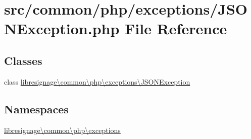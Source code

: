 \hypertarget{JSONException_8php}{}\section{src/common/php/exceptions/\+J\+S\+O\+N\+Exception.php File Reference}
\label{JSONException_8php}
\subsection*{Classes}
\begin{DoxyCompactItemize}
\item 
class \hyperlink{classlibresignage_1_1common_1_1php_1_1exceptions_1_1JSONException}{libresignage\textbackslash{}common\textbackslash{}php\textbackslash{}exceptions\textbackslash{}\+J\+S\+O\+N\+Exception}
\end{DoxyCompactItemize}
\subsection*{Namespaces}
\begin{DoxyCompactItemize}
\item 
 \hyperlink{namespacelibresignage_1_1common_1_1php_1_1exceptions}{libresignage\textbackslash{}common\textbackslash{}php\textbackslash{}exceptions}
\end{DoxyCompactItemize}
